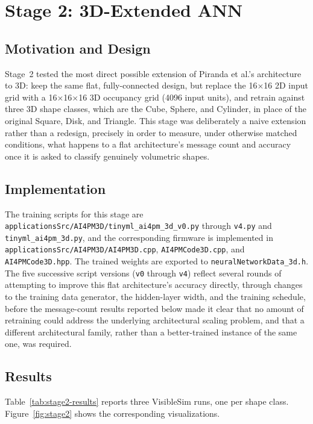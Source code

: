 \documentclass[12pt,a4paper]{report}
\begin{document}
\section{Stage 2: 3D-Extended ANN}
\label{sec:stage2}

\subsection*{Motivation and Design}

Stage~2 tested the most direct possible extension of Piranda et al.'s architecture to 3D: keep the same flat, fully-connected design, but replace the 16$\times$16 2D input grid with a 16$\times$16$\times$16 3D occupancy grid (4096 input units), and retrain against three 3D shape classes, which are the Cube, Sphere, and Cylinder, in place of the original Square, Disk, and Triangle. This stage was deliberately a naive extension rather than a redesign, precisely in order to measure, under otherwise matched conditions, what happens to a flat architecture's message count and accuracy once it is asked to classify genuinely volumetric shapes.

\subsection*{Implementation}

The training scripts for this stage are \texttt{applicationsSrc/AI4PM3D/tinyml\_ai4pm\_3d\_v0.py} through \texttt{v4.py} and \texttt{tinyml\_ai4pm\_3d.py}, and the corresponding firmware is implemented in \texttt{applicationsSrc/AI4PM3D/AI4PM3D.cpp}, \texttt{AI4PMCode3D.cpp}, and \texttt{AI4PMCode3D.hpp}. The trained weights are exported to \texttt{neuralNetworkData\_3d.h}. The five successive script versions (\texttt{v0} through \texttt{v4}) reflect several rounds of attempting to improve this flat architecture's accuracy directly, through changes to the training data generator, the hidden-layer width, and the training schedule, before the message-count results reported below made it clear that no amount of retraining could address the underlying architectural scaling problem, and that a different architectural family, rather than a better-trained instance of the same one, was required.

\subsection*{Results}

Table~\ref{tab:stage2-results} reports three VisibleSim runs, one per shape class. Figure~\ref{fig:stage2} shows the corresponding visualizations.
\end{document}
